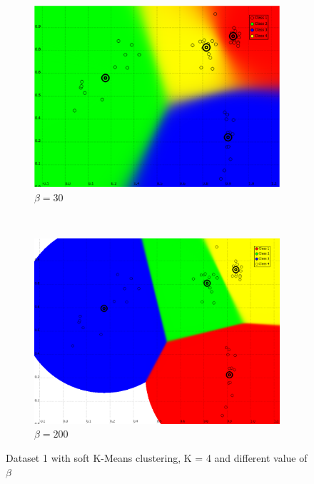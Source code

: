 \documentclass[a4paper,10pt]{article}
\begin{document}
\begin{figure}[H]
\begin{subfigure}[t]{0.2\textwidth}
      \centering
      \includegraphics[width=\textwidth]{pictures/dataset_1_soft-Kmeans-4K-beta30}
      \caption{$\beta = 30$}
      \label{fig:dataset_1_soft-Kmeans-4K-beta30}
     \end{subfigure}
      ~
    \begin{subfigure}[t]{0.2\textwidth}
      \centering
      \includegraphics[width=\textwidth]{pictures/dataset_1_soft-Kmeans-4K-beta200}
      \caption{$\beta = 200$}
      \label{fig:dataset_1_soft-Kmeans-4K-beta200}
     \end{subfigure}
     \caption{Dataset 1 with soft K-Means clustering, K = 4 and different value of $\beta$}
     \label{fig:soft_kmeans_varyb}
\end{figure}
\end{document}
